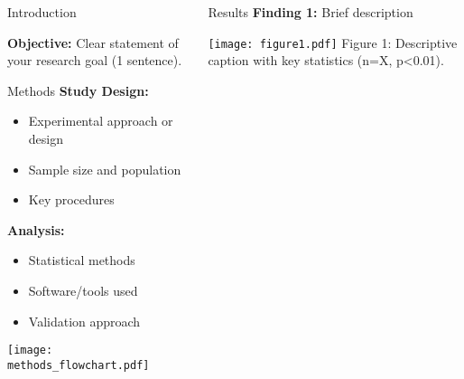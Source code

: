 \documentclass[final,t]{beamer}
\begin{document}
\begin{frame}[t]
\begin{columns}[t]
\begin{column}{.3\linewidth}
\begin{block}{Introduction}
        \vspace{0.5cm}
        
        \textbf{Objective:} Clear statement of your research goal (1 sentence).
      \end{block}
      
      \vspace{1cm}
      
      \begin{block}{Methods}
        \textbf{Study Design:}
        \begin{itemize}
          \item Experimental approach or design
          \item Sample size and population
          \item Key procedures
        \end{itemize}
        
        \vspace{0.5cm}
        
        \textbf{Analysis:}
        \begin{itemize}
          \item Statistical methods
          \item Software/tools used
          \item Validation approach
        \end{itemize}
        
        \vspace{0.5cm}
        
        \begin{center}
          \texttt{[image: methods\_flowchart.pdf]}
        \end{center}
      \end{block}
      
    \end{column}
    
    \begin{column}{.3\linewidth}
      
      \begin{block}{Results}
        \textbf{Finding 1:} Brief description
        
        \begin{center}
          \texttt{[image: figure1.pdf]}
          \small Figure 1: Descriptive caption with key statistics (n=X, p<0.01).
        \end{center}
        

\end{block}
\end{column}
\end{columns}
\end{frame}
\end{document}
